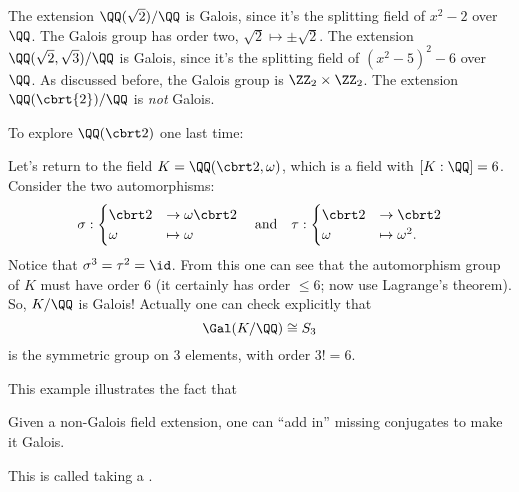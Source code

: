 \begin{example}
	\listhack
	\begin{enumerate}[(a)]
		\ii The extension $\QQ(\sqrt2) / \QQ$ is Galois,
		since it's the splitting field of $x^2-2$ over $\QQ$.
		The Galois group has order two, $\sqrt 2 \mapsto \pm \sqrt 2$.
		\ii The extension $\QQ(\sqrt2, \sqrt 3) / \QQ$ is Galois,
		since it's the splitting field of $(x^2-5)^2-6$ over $\QQ$.
		As discussed before, the Galois group is $\Zc 2 \times \Zc 2$.
		\ii The extension $\QQ(\cbrt{2}) / \QQ$ is \emph{not} Galois.
	\end{enumerate}
\end{example}


To explore $\QQ(\cbrt 2)$ one last time:
\begin{example}
	Let's return to the field $K = \QQ(\cbrt 2, \omega)$,
	which is a field with $[K:\QQ] = 6$.
	Consider the two automorphisms:
	\[
		\sigma:
		\begin{cases}
			\cbrt 2 &\to \omega \cbrt 2 \\
			\omega &\mapsto \omega
		\end{cases}
		\quad\text{and}\quad
		\tau:
		\begin{cases}
			\cbrt 2 &\to \cbrt 2 \\
			\omega &\mapsto \omega^2.
		\end{cases}
	\]
	Notice that $\sigma^3 = \tau^2 = \id$.
	From this one can see that the automorphism group of $K$ must have order $6$
	(it certainly has order $\le 6$; now use Lagrange's theorem).
	So, $K/\QQ$ is Galois! Actually one can check explicitly that
	\[ \Gal(K/\QQ) \cong S_3 \]
	is the symmetric group on $3$ elements, with order $3! = 6$.
\end{example}
This example illustrates the fact that
\begin{moral}
	Given a non-Galois field extension, 
	one can ``add in'' missing conjugates to make it Galois.
\end{moral}
This is called taking a .

